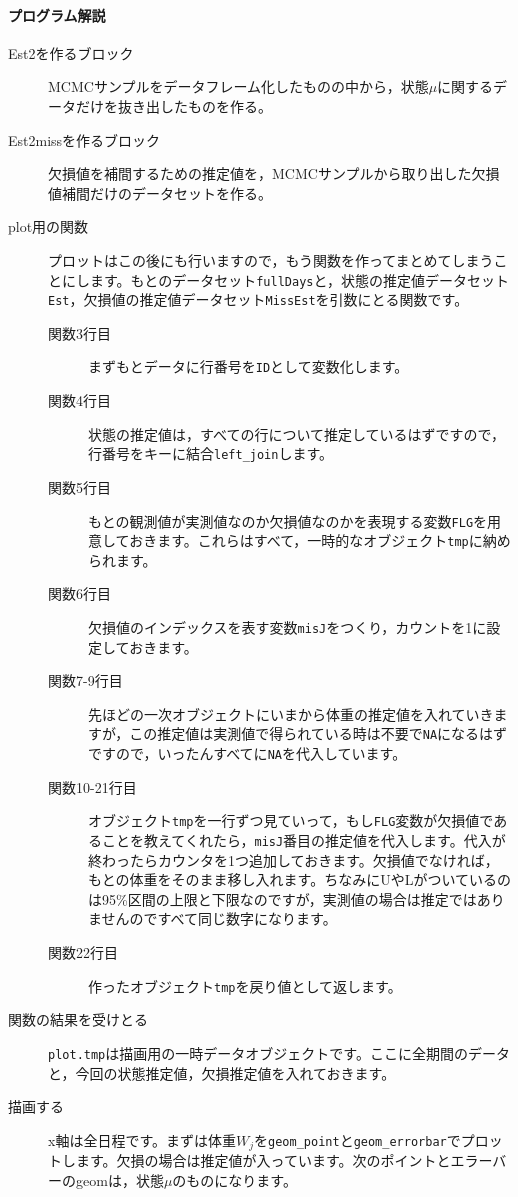 \documentclass{ltjsbook}
\begin{document}
\paragraph{プログラム解説}
\begin{description}
   \item[Est2を作るブロック] MCMCサンプルをデータフレーム化したものの中から，状態$\mu$に関するデータだけを抜き出したものを作る。
   \item[Est2missを作るブロック] 欠損値を補間するための推定値を，MCMCサンプルから取り出した欠損値補間だけのデータセットを作る。
   \item[plot用の関数] プロットはこの後にも行いますので，もう関数を作ってまとめてしまうことにします。もとのデータセット\verb|fullDays|と，状態の推定値データセット\verb|Est|，欠損値の推定値データセット\verb|MissEst|を引数にとる関数です。
      \begin{description}
         \item[関数3行目] まずもとデータに行番号を\verb|ID|として変数化します。
         \item[関数4行目] 状態の推定値は，すべての行について推定しているはずですので，行番号をキーに結合\verb|left_join|します。
         \item[関数5行目] もとの観測値が実測値なのか欠損値なのかを表現する変数\verb|FLG|を用意しておきます。これらはすべて，一時的なオブジェクト\verb|tmp|に納められます。
         \item[関数6行目] 欠損値のインデックスを表す変数\verb|misJ|をつくり，カウントを1に設定しておきます。
         \item[関数7-9行目] 先ほどの一次オブジェクトにいまから体重の推定値を入れていきますが，この推定値は実測値で得られている時は不要で\verb|NA|になるはずですので，いったんすべてに\verb|NA|を代入しています。
         \item[関数10-21行目] オブジェクト\verb|tmp|を一行ずつ見ていって，もし\verb|FLG|変数が欠損値であることを教えてくれたら，\verb|misJ|番目の推定値を代入します。代入が終わったらカウンタを1つ追加しておきます。欠損値でなければ，もとの体重をそのまま移し入れます。ちなみにUやLがついているのは95\%区間の上限と下限なのですが，実測値の場合は推定ではありませんのですべて同じ数字になります。
         \item[関数22行目] 作ったオブジェクト\verb|tmp|を戻り値として返します。
      \end{description}
   \item[関数の結果を受けとる] \verb|plot.tmp|は描画用の一時データオブジェクトです。ここに全期間のデータと，今回の状態推定値，欠損推定値を入れておきます。
   \item[描画する] x軸は全日程です。まずは体重$W_j$を\verb|geom_point|と\verb|geom_errorbar|でプロットします。欠損の場合は推定値が入っています。次のポイントとエラーバーのgeomは，状態$\mu$のものになります。
\end{description}
\end{document}
